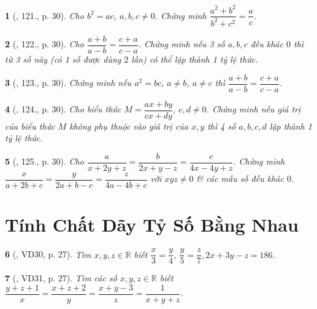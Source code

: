 \documentclass{article}
\newtheorem{baitoan}{}
\begin{document}
\begin{baitoan}[\cite{Tuyen_Toan_7}, 121., p. 30]
	Cho $b^2 = ac$, $a,b,c\ne 0$. Chứng minh $\dfrac{a^2 + b^2}{b^2 + c^2} = \dfrac{a}{c}$.
\end{baitoan}

\begin{baitoan}[\cite{Tuyen_Toan_7}, 122., p. 30]
	Cho $\dfrac{a + b}{a - b} = \dfrac{c + a}{c - a}$. Chứng minh nếu 3 số $a,b,c$ đều khác $0$ thì từ 3 số này (có 1 số được dùng $2$ lần) có thể lập thành 1 tỷ lệ thức.
\end{baitoan}

\begin{baitoan}[\cite{Tuyen_Toan_7}, 123., p. 30]
	Chứng minh nếu $a^2 = bc$, $a\ne b$, $a\ne c$ thì $\dfrac{a + b}{a - b} = \dfrac{c + a}{c - a}$.
\end{baitoan}

\begin{baitoan}[\cite{Tuyen_Toan_7}, 124., p. 30]
	Cho biểu thức $M = \dfrac{ax + by}{cx + dy}$, $c,d\ne 0$. Chứng minh nếu giá trị của biểu thức $M$ không phụ thuộc vào giá trị của $x,y$ thì 4 số $a,b,c,d$ lập thành 1 tỷ lệ thức.
\end{baitoan}

\begin{baitoan}[\cite{Tuyen_Toan_7}, 125., p. 30]
	Cho $\dfrac{a}{x + 2y + z} = \dfrac{b}{2x + y - z} = \dfrac{c}{4x - 4y + z}$. Chứng minh $\dfrac{x}{a + 2b + c} = \dfrac{y}{2a + b - c} = \dfrac{z}{4a - 4b + c}$ với $xyz\ne 0$ \& các mẫu số đều khác $0$.
\end{baitoan}


\section{Tính Chất Dãy Tỷ Số Bằng Nhau}

\begin{baitoan}[\cite{Binh_Toan_7_tap_1}, VD30, p. 27]
	Tìm $x,y,z\in\mathbb{R}$ biết $\dfrac{x}{3} = \dfrac{y}{4}$, $\dfrac{y}{5} = \dfrac{z}{7},2x + 3y - z = 186$.
\end{baitoan}

\begin{baitoan}[\cite{Binh_Toan_7_tap_1}, VD31, p. 27]
	Tìm các số $x,y,z\in\mathbb{R}$ biết $\dfrac{y + z + 1}{x} = \dfrac{x + z + 2}{y} = \dfrac{x + y - 3}{z} = \dfrac{1}{x + y + z}$.
\end{baitoan}
\end{document}
